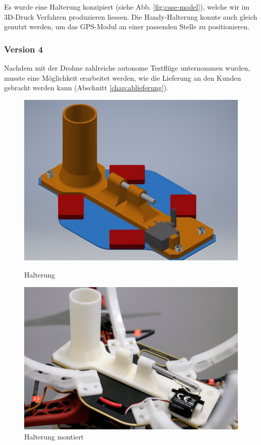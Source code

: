 Es wurde eine Halterung konzipiert (siehe Abb. \ref{fig:case-model}), welche wir im 3D-Druck Verfahren produzieren liessen.
Die Handy-Halterung konnte auch gleich genutzt werden, um das GPS-Modul an einer passenden Stelle zu positionieren.

\subsubsection{Version 4}
Nachdem mit der Drohne zahlreiche autonome Testflüge unternommen wurden, musste eine Möglichkeit erarbeitet werden, wie die Lieferung an den Kunden gebracht werden kann (Abschnitt  \ref{chap:ablieferung}).

\begin{figure}[H]
	\centering
	\begin{minipage}[b]{0.4\textwidth}
		\includegraphics[width=\textwidth]{images/hardware/parachute-model.jpg}
		\caption{Halterung}
		\label{fig:parachute-mode}
	\end{minipage}
	\hfill
	\begin{minipage}[b]{0.45\textwidth}
\includegraphics[width=\textwidth]{images/hardware/drone-with-servo.jpg}
		\caption{Halterung montiert}
		\label{fig:drone-with-servo}
	\end{minipage}
\end{figure}


